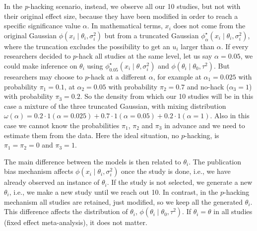 In the \textit{p}-hacking scenario, instead, we observe all our 10 studies, but not with their original effect size, because they have been modified in order to reach a specific significance value $\alpha$. In mathematical terms, $x_i$ does not come from the original Gaussian $\phi(x_{i}\mid\theta_i,\sigma^2_{i})$ but from a truncated Gaussian $\phi_\alpha^{\star}(x_{i}\mid\theta_i,\sigma^2_{i})$, where the truncation excludes the possibility to get an $u_i$ larger than $\alpha$. If every researchers decided to $p$-hack all studies at the same level, let us say $\alpha = 0.05$, we could make inference on $\theta_i$ using $\phi_{0.05}^{\star}(x_{i}\mid\theta,\sigma^2_{i})$ and $\phi(\theta_{i}\mid\theta_0,\tau^2)$. But researchers may choose to $p$-hack at a different $\alpha$, for example at $\alpha_1 = 0.025$ with probability $\pi_1=  0.1$, at $\alpha_2 = 0.05$ with probability $\pi_2 = 0.7$ and no-hack ($\alpha_3 = 1$) with probability $\pi_3 = 0.2$. So the density from which our 10 studies will be in this case a mixture of the three truncated Gaussian, with mixing distribution $\omega(\alpha) = 0.2 \cdot 1(\alpha = 0.025) + 0.7 \cdot 1(\alpha = 0.05) + 0.2 \cdot 1(\alpha = 1)$. Also in this case we cannot know the probabilities $\pi_1$, $\pi_2$ and $\pi_3$ in advance and we need to estimate them from the data. Here the ideal situation, no $p$-hacking, is $\pi_1 = \pi_2 = 0$ and $\pi_3 = 1$.

The main difference between the models is then related to $\theta_i$. The publication bias mechanism affects $\phi(x_{i}\mid\theta_i,\sigma^2_{i})$ once the study is done, i.e., we have already observed an instance of $\theta_i$. If the study is not selected, we generate a new $\theta_i$, i.e., we make a new study until we reach out 10. In contrast, in the $p$-hacking mechanism all studies are retained, just modified, so we keep all the generated $\theta_i$. This difference affects the distribution of $\theta_i$, $\phi(\theta_{i}\mid\theta_0,\tau^2)$. If $\theta_i = \theta$ in all studies (fixed effect meta-analysis), it does not matter.
